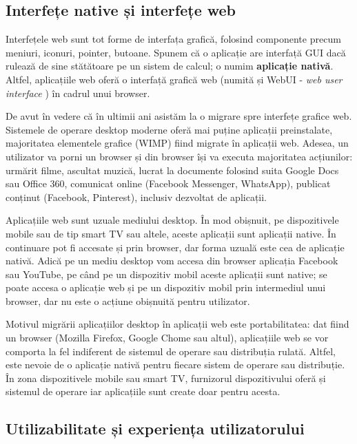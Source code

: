 \newpage

\subsection{Interfețe native și interfețe web}
\label{sec:ui:native-web}

Interfețele web sunt tot forme de interfața grafică, folosind componente precum meniuri, iconuri, pointer, butoane.
Spunem că o aplicație are interfață GUI dacă rulează de sine stătătoare pe un sistem de calcul;
o numim \textbf{aplicație nativă}.
Altfel, aplicațiile web oferă o interfață grafică web (numită și WebUI - \textit{web user interface} ) în cadrul unui browser.

De avut în vedere că în ultimii ani asistăm la o migrare spre interfețe grafice web.
Sistemele de operare desktop moderne oferă mai puține aplicații preinstalate, majoritatea elementele grafice (WIMP) fiind migrate în aplicații web.
Adesea, un utilizator va porni un browser și din browser își va executa majoritatea acțiunilor: urmărit filme, ascultat muzică, lucrat la documente folosind suita Google Docs sau Office 360, comunicat online (Facebook Messenger, WhatsApp), publicat conținut (Facebook, Pinterest), inclusiv dezvoltat de aplicații.

Aplicațiile web sunt uzuale mediului desktop.
În mod obișnuit, pe dispozitivele mobile sau de tip smart TV sau altele, aceste aplicații sunt aplicații native.
În continuare pot fi accesate și prin browser, dar forma uzuală este cea de aplicație nativă.
Adică pe un mediu desktop vom accesa din browser aplicația Facebook sau YouTube, pe când pe un dispozitiv mobil aceste aplicații sunt native;
se poate accesa o aplicație web și pe un dispozitiv mobil prin intermediul unui browser, dar nu este o acțiune obișnuită pentru utilizator.

Motivul migrării aplicațiilor desktop în aplicații web este portabilitatea: dat fiind un browser (Mozilla Firefox, Google Chome sau altul), aplicațiile web se vor comporta la fel indiferent de sistemul de operare sau distribuția rulată.
Altfel, este nevoie de o aplicație nativă pentru fiecare sistem de operare sau distribuție.
În zona dispozitivele mobile sau smart TV, furnizorul dispozitivului oferă și sistemul de operare iar aplicațiile sunt create doar pentru acesta.

\subsection{Utilizabilitate și experiența utilizatorului}
\label{sec:ui:ux}

